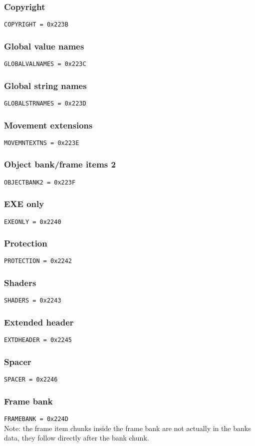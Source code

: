 \documentclass{article}
\begin{document}
\subsubsection{Copyright}
\verb|COPYRIGHT = 0x223B|

\subsubsection{Global value names}
\verb|GLOBALVALNAMES = 0x223C|

\subsubsection{Global string names}
\verb|GLOBALSTRNAMES = 0x223D|

\subsubsection{Movement extensions}
\verb|MOVEMNTEXTNS = 0x223E|

\subsubsection{Object bank/frame items 2}
\verb|OBJECTBANK2 = 0x223F|

\subsubsection{EXE only}
\verb|EXEONLY = 0x2240|

\subsubsection{Protection}
\verb|PROTECTION = 0x2242|

\subsubsection{Shaders}
\verb|SHADERS = 0x2243|

\subsubsection{Extended header}
\verb|EXTDHEADER = 0x2245|

\subsubsection{Spacer}
\verb|SPACER = 0x2246|

\subsubsection{Frame bank}
\verb|FRAMEBANK = 0x224D|
\\
Note: the frame item chunks inside the frame bank are not actually in the banks
data, they follow directly after the bank chunk.
\end{document}
